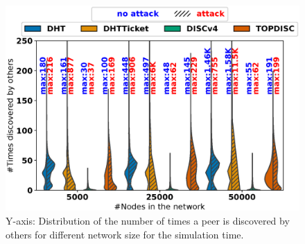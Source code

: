 \begin{figure}[!h]
\includegraphics[width=\linewidth]{results/split/size_wasDiscovered.eps}
\caption{Y-axis: Distribution of the number of times a peer is discovered by others for different network size for the simulation time.}
\label{fig:efficiency_size}
\end{figure}

%
%
%
%
%

